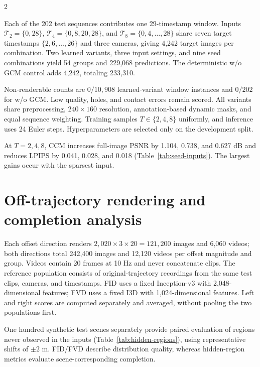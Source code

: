 \begin{multicols}{2}

Each of the 202 test sequences contributes one 29-timestamp window. Inputs $\mathcal T_2=\{0,28\}$, $\mathcal T_4=\{0,8,20,28\}$, and $\mathcal T_8=\{0,4,\ldots,28\}$ share seven target timestamps $\{2,6,\ldots,26\}$ and three cameras, giving 4,242 target images per combination. Two learned variants, three input settings, and nine seed combinations yield 54 groups and 229,068 predictions. The deterministic w/o GCM control adds 4,242, totaling 233,310.

Non-renderable counts are $0/10,908$ learned-variant window instances and $0/202$ for w/o GCM. Low quality, holes, and contact errors remain scored. All variants share preprocessing, $240\times160$ resolution, annotation-based dynamic masks, and equal sequence weighting. Training samples $T\in\{2,4,8\}$ uniformly, and inference uses 24 Euler steps. Hyperparameters are selected only on the development split.

At $T=2,4,8$, CCM increases full-image PSNR by 1.104, 0.738, and 0.627 dB and reduces LPIPS by 0.041, 0.028, and 0.018 (Table~\ref{tab:seed-inputs}). The largest gains occur with the sparsest input.

\section{Off-trajectory rendering and completion analysis}
\label{sec:supp-hidden}

Each offset direction renders $2,020\times3\times20=121,200$ images and 6,060 videos; both directions total 242,400 images and 12,120 videos per offset magnitude and group. Videos contain 20 frames at 10 Hz and never concatenate clips. The reference population consists of original-trajectory recordings from the same test clips, cameras, and timestamps. FID uses a fixed Inception-v3 with 2,048-dimensional features; FVD uses a fixed I3D with 1,024-dimensional features. Left and right scores are computed separately and averaged, without pooling the two populations first.

One hundred synthetic test scenes separately provide paired evaluation of regions never observed in the inputs (Table~\ref{tab:hidden-regions}), using representative shifts of $\pm2$ m. FID/FVD describe distribution quality, whereas hidden-region metrics evaluate scene-corresponding completion.


\end{multicols}
